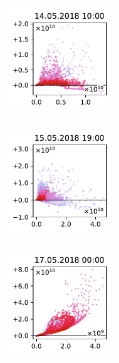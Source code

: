 \begin{figure}[H]
    \centering
    \begin{subfigure}
        \centering
        \includegraphics[width=0.30\textwidth,valign=t]{evaluation/figures/perturbations/perturbation-14.05.2018:10.00-so2-mul-1.5.pdf}
    \end{subfigure}
    \begin{subfigure}
        \centering
        \includegraphics[width=0.30\textwidth,valign=t]{evaluation/figures/perturbations/perturbation-15.05.2018:19.00-so2-mul-1.5.pdf}
    \end{subfigure}
    \begin{subfigure}
        \centering
        \includegraphics[width=0.30\textwidth,valign=t]{evaluation/figures/perturbations/perturbation-17.05.2018:00.00-so2-mul-1.5.pdf}
    \end{subfigure}


\end{figure}
